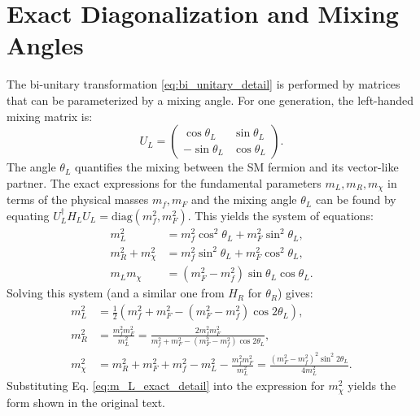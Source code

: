 \section{Exact Diagonalization and Mixing Angles}
The bi-unitary transformation \eqref{eq:bi_unitary_detail} is performed by matrices that can be parameterized by a mixing angle. For one generation, the left-handed mixing matrix is:
\begin{equation}
U_L = \begin{pmatrix}
\cos\theta_L & \sin\theta_L \\
-\sin\theta_L & \cos\theta_L
\end{pmatrix}.
\end{equation}
The angle $\theta_L$ quantifies the mixing between the SM fermion and its vector-like partner. The exact expressions for the fundamental parameters $m_L, m_R, m_\chi$ in terms of the physical masses $m_f, m_F$ and the mixing angle $\theta_L$ can be found by equating $U_L^\dagger H_L U_L = \text{diag}(m_f^2, m_F^2)$. This yields the system of equations:
\begin{align*}
m_L^2 &= m_f^2 \cos^2\theta_L + m_F^2 \sin^2\theta_L, \\
m_R^2 + m_\chi^2 &= m_f^2 \sin^2\theta_L + m_F^2 \cos^2\theta_L, \\
m_L m_\chi &= (m_F^2 - m_f^2) \sin\theta_L \cos\theta_L.
\end{align*}
Solving this system (and a similar one from $H_R$ for $\theta_R$) gives:
\begin{align}
m_L^2 &= \frac{1}{2} \left( m_f^2 + m_F^2 - (m_F^2 - m_f^2) \cos 2\theta_L \right), \label{eq:m_L_exact_detail} \\
m_R^2 &= \frac{m_f^2 m_F^2}{m_L^2} = \frac{2 m_f^2 m_F^2}{m_f^2 + m_F^2 - (m_F^2 - m_f^2) \cos 2\theta_L}, \label{eq:m_R_exact_detail} \\
m_{\chi}^2 &= m_R^2 + m_F^2 + m_f^2 - m_L^2 - \frac{m_f^2 m_F^2}{m_L^2} = \frac{(m_F^2 - m_f^2)^2 \sin^2 2\theta_L}{4 m_L^2}. \label{eq:m_chi_exact_detail}
\end{align}
Substituting Eq. \eqref{eq:m_L_exact_detail} into the expression for $m_{\chi}^2$ yields the form shown in the original text.

